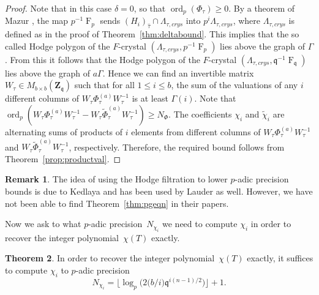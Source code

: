 \documentclass[a4paper,11pt]{article}
\numberwithin{equation}{section}
\providecommand{\floorbig}[1]{\bigl\lfloor#1\bigr\rfloor} %
\newcommand{\ZZ}{\mathbf{Z}} %
\DeclareMathOperator{\ord}{ord}          %
\DeclareMathOperator{\Frob}{F}           %
\theoremstyle{definition}
\newtheorem{thm}{Theorem}[section]
\newtheorem{rem}[thm]{Remark}
\begin{document}
\begin{proof} 
Note that in this case $\delta=0$, so that $\ord_p(\Phi_{\tau}) \geq 0$. 
By a theorem of Mazur \citep{Mazur1972}, the map $p^{-1} \Frob_p$ 
sends $(H_i)_{\hat{\tau}} \cap \Lambda_{\tau,crys}$ into $p^i \Lambda_{\tau,crys}$, 
where $\Lambda_{\tau,crys}$ is defined as in the proof of 
Theorem~\ref{thm:deltabound}. This implies that the so called Hodge polygon 
of the $F$-crystal $(\Lambda_{\tau,crys},p^{-1} \Frob_p)$ lies above the graph of 
$\Gamma$. From this it follows that the Hodge polygon of the $F$-crystal 
$(\Lambda_{\tau,crys},\mathfrak{q}^{-1} \Frob_{\mathfrak{q}})$ lies
above the graph of $a\Gamma$. Hence we can find an invertible matrix 
$W_{\tau} \in M_{b \times b}(\ZZ_{\mathfrak{q}})$ such that for all 
$1 \leq i \leq b$, the sum of the valuations of any $i$ different columns
of $W_{\tau} \Phi_{\tau}^{(a)} W_{\tau}^{-1}$ is at least $\Gamma(i)$.
Note that 
$\ord_p(W_{\tau }\Phi_{\tau}^{(a)} W_{\tau}^{-1}-W_{\tau } \tilde{\Phi}_{\tau}^{(a)} W_{\tau}^{-1}) \geq N_{\Phi}$.
The coefficients $\chi_i$ and $\tilde{\chi}_i$ are alternating sums 
of products of $i$ elements from different columns of 
$W_{\tau }\Phi_{\tau}^{(a)} W_{\tau}^{-1}$ 
and $W_{\tau } \tilde{\Phi}_{\tau}^{(a)} W_{\tau}^{-1}$, respectively.  
Therefore, the required bound follows from Theorem~\ref{prop:productval}. 
\end{proof}

\begin{rem}
The idea of using the Hodge filtration to lower $p$-adic precision bounds is
due to Kedlaya and has been used by Lauder \citep[\S 9.3.2]{Lauder2006} as well. However, we have not
been able to find Theorem~\ref{thm:pgeqn} in their papers. 
\end{rem}

Now we ask to what $p$-adic precision~$N_{\chi_i}$ we need to compute $\chi_i$ 
in order to recover the integer polynomial~$\chi(T)$ exactly.

\begin{thm} \label{thm:N0}
In order to recover the integer polynomial~$\chi(T)$ exactly, 
it suffices to compute $\chi_i$ to $p$-adic precision 
\begin{equation*}
N_{\chi_i} = \floorbig{\log_p \bigl( 2 \bigl( b/i \bigr) \mathfrak{q}^{i (n-1) / 2} \bigr)} + 1.
\end{equation*}
\end{thm}
\end{document}
